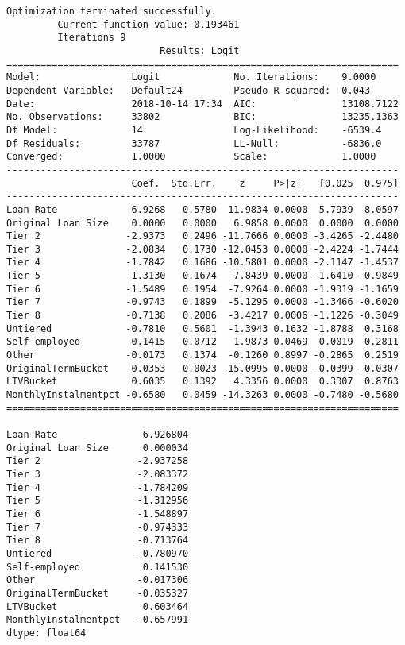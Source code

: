 \documentclass[11pt]{article}
\begin{document}
    \begin{Verbatim}[commandchars=\\\{\}]
Optimization terminated successfully.
         Current function value: 0.193461
         Iterations 9
                           Results: Logit
=====================================================================
Model:                Logit             No. Iterations:    9.0000    
Dependent Variable:   Default24         Pseudo R-squared:  0.043     
Date:                 2018-10-14 17:34  AIC:               13108.7122
No. Observations:     33802             BIC:               13235.1363
Df Model:             14                Log-Likelihood:    -6539.4   
Df Residuals:         33787             LL-Null:           -6836.0   
Converged:            1.0000            Scale:             1.0000    
---------------------------------------------------------------------
                      Coef.  Std.Err.    z     P>|z|   [0.025  0.975]
---------------------------------------------------------------------
Loan Rate             6.9268   0.5780  11.9834 0.0000  5.7939  8.0597
Original Loan Size    0.0000   0.0000   6.9858 0.0000  0.0000  0.0000
Tier 2               -2.9373   0.2496 -11.7666 0.0000 -3.4265 -2.4480
Tier 3               -2.0834   0.1730 -12.0453 0.0000 -2.4224 -1.7444
Tier 4               -1.7842   0.1686 -10.5801 0.0000 -2.1147 -1.4537
Tier 5               -1.3130   0.1674  -7.8439 0.0000 -1.6410 -0.9849
Tier 6               -1.5489   0.1954  -7.9264 0.0000 -1.9319 -1.1659
Tier 7               -0.9743   0.1899  -5.1295 0.0000 -1.3466 -0.6020
Tier 8               -0.7138   0.2086  -3.4217 0.0006 -1.1226 -0.3049
Untiered             -0.7810   0.5601  -1.3943 0.1632 -1.8788  0.3168
Self-employed         0.1415   0.0712   1.9873 0.0469  0.0019  0.2811
Other                -0.0173   0.1374  -0.1260 0.8997 -0.2865  0.2519
OriginalTermBucket   -0.0353   0.0023 -15.0995 0.0000 -0.0399 -0.0307
LTVBucket             0.6035   0.1392   4.3356 0.0000  0.3307  0.8763
MonthlyInstalmentpct -0.6580   0.0459 -14.3263 0.0000 -0.7480 -0.5680
=====================================================================

Loan Rate               6.926804
Original Loan Size      0.000034
Tier 2                 -2.937258
Tier 3                 -2.083372
Tier 4                 -1.784209
Tier 5                 -1.312956
Tier 6                 -1.548897
Tier 7                 -0.974333
Tier 8                 -0.713764
Untiered               -0.780970
Self-employed           0.141530
Other                  -0.017306
OriginalTermBucket     -0.035327
LTVBucket               0.603464
MonthlyInstalmentpct   -0.657991
dtype: float64

    \end{Verbatim}
\end{document}
